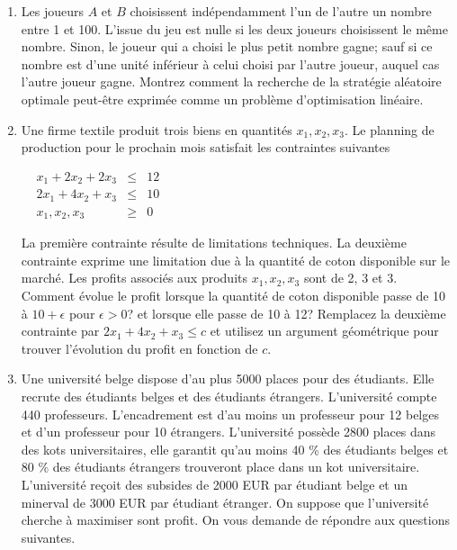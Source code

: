 \begin{enumerate}
  \item Les joueurs $A$ et $B$ choisissent indépendamment l'un de l'autre un nombre entre 1 et 100. L'issue du jeu est nulle si les
    deux joueurs choisissent le même nombre. Sinon, le joueur qui a choisi le plus petit nombre gagne; sauf si ce nombre est d'une unité
    inférieur à celui choisi par l'autre joueur, auquel cas l'autre joueur gagne. Montrez comment la recherche de la stratégie aléatoire
    optimale peut-être exprimée comme un problème d'optimisation linéaire.


    \begin{solution}
      \nosolution
    \end{solution}

  \item Une firme textile produit trois biens en quantités $x_1, x_2, x_3$. Le planning de production pour le prochain mois satisfait
    les contraintes suivantes

    $
    \begin{array}{llcr}
      & x_1+2x_2 +2x_3 & \leq & 12\\
      & 2x_1+4x_2 +x_3 & \leq & 10\\
      & x_1, x_2, x_3 & \geq & 0
    \end{array}
    $

    La première contrainte résulte de limitations techniques. La deuxième contrainte exprime une limitation due à la quantité de coton
    disponible sur le marché. Les profits associés aux produits $x_1, x_2, x_3$
    sont de 2, 3 et 3. Comment évolue le profit  lorsque la quantité de coton disponible passe de 10 à $10+ \epsilon$ pour
    $\epsilon >0$? et lorsque elle passe de 10 à 12? Remplacez la deuxième
    contrainte par $2x_1+4x_2 +x_3 \leq c$ et utilisez un argument géométrique pour trouver l'évolution du profit en fonction de $c$.







    \begin{solution}
      \nosolution
    \end{solution}

  \item  Une université belge dispose d'au plus 5000 places pour des étudiants. Elle recrute des étudiants belges et
    des étudiants étrangers. L'université compte 440 professeurs. L'encadrement est d'au moins un professeur pour 12 belges et d'un professeur pour 10
    étrangers. L'université possède 2800 places dans des kots universitaires, elle garantit  qu'au moins 40 \% des étudiants belges et 80 \% des étudiants
    étrangers trouveront place  dans un kot universitaire. L'université reçoit des subsides de 2000 EUR par étudiant belge et un minerval de 3000 EUR par
    étudiant étranger. On suppose que l'université cherche à maximiser sont profit.  On vous demande de répondre aux questions suivantes.


\end{enumerate}
